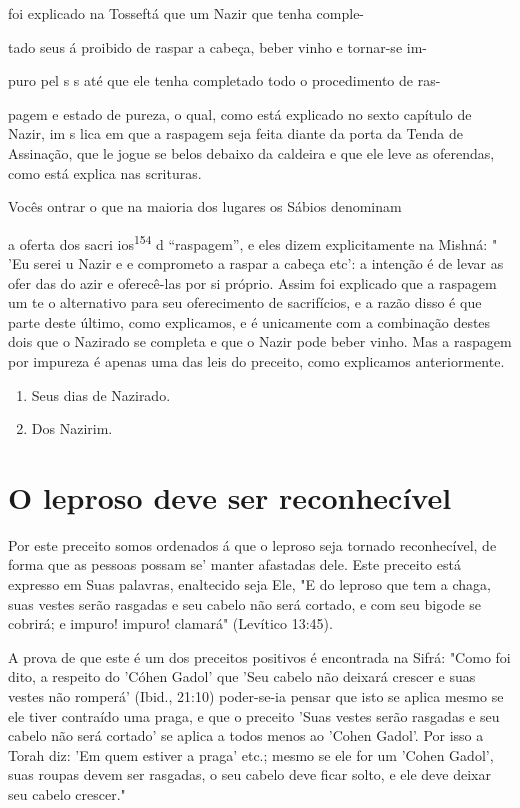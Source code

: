 foi explicado na Tosseftá que um Nazir que tenha comple-


tado seus á proibido de raspar a cabeça, beber vinho e tornar-se im-

puro pel s s até que ele tenha completado todo o procedimento de ras-

pagem e estado de pureza, o qual, como está explicado no sexto capítulo
de Nazir, im s lica em que a raspagem seja feita diante da porta da
Tenda de Assina­ção, que le jogue se belos debaixo da caldeira e que ele
leve as oferendas, como está explica nas scrituras.

Vocês ontrar o que na maioria dos lugares os Sábios denominam

a oferta dos sacri ios\textsuperscript{154} d ``raspagem'', e eles dizem
explicitamente na Mish­ná: " 'Eu serei u Nazir e e comprometo a raspar a
cabeça etc': a intenção é de levar as ofer das do azir e oferecê-las por
si próprio. Assim foi explica­do que a raspagem um te o alternativo para
seu oferecimento de sacrifícios, e a razão disso é que parte deste
último, como explicamos, e é unicamente com a combinação destes dois que
o Nazirado se completa e que o Nazir pode beber vinho. Mas a raspagem
por impureza é apenas uma das leis do preceito, como explicamos
anteriormente.


\begin{enumerate}
\def\labelenumi{\arabic{enumi}.}
\setcounter{enumi}{152}
\item
 
 Seus dias de Nazirado.
 
\item
 
 Dos Nazirim.
 
\end{enumerate}




\section{O leproso deve ser reconhecível}

Por este preceito somos ordenados á que o leproso seja tornado
re­conhecível, de forma que as pessoas possam se' manter afastadas dele.
Este pre­ceito está expresso em Suas palavras, enaltecido seja Ele, "E
do leproso que tem a chaga, suas vestes serão rasgadas e seu cabelo não
será cortado, e com seu bigode se cobrirá; e impuro! impuro! clamará"
(Levítico 13:45).

A prova de que este é um dos preceitos positivos é encontrada na Sifrá:
"Como foi dito, a respeito do 'Cóhen Gadol' que 'Seu cabelo não deixará
crescer e suas vestes não romperá' (Ibid., 21:10) poder-se-ia pensar que
isto se aplica mesmo se ele tiver contraído uma praga, e que o preceito
'Suas vestes serão rasgadas e seu cabelo não será cortado' se aplica a
todos menos ao 'Co­hen Gadol'. Por isso a Torah diz: 'Em quem estiver a
praga' etc.; mesmo se ele for um 'Cohen Gadol', suas roupas devem ser
rasgadas, o seu cabelo deve ficar solto, e ele deve deixar seu cabelo
crescer."


